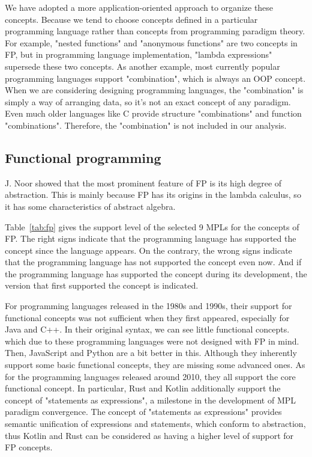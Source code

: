 We have adopted a more application-oriented approach to organize these concepts.
Because we tend to choose concepts defined in a particular programming
language rather than concepts from programming paradigm theory.
For example, "nested functions" and "anonymous functions" are two concepts in FP,
but in programming language implementation, "lambda expressions" supersede these two concepts.
As another example, most currently popular programming languages support "combination",
which is always an OOP concept.
When we are considering designing programming languages, the "combination" is simply a way of
arranging data, so it's not an exact concept of any paradigm.
Even much older languages like C provide structure "combinations" and
function "combinations".
Therefore, the "combination" is not included in our analysis.

\subsection{Functional programming}

J. Noor showed that the most prominent feature of FP is its high degree of abstraction\cite{vezzosi2019cubical}.
This is mainly because FP has its origins in the lambda calculus,
so it has some characteristics of abstract algebra.


Table~\ref{tab:fp} gives the support level of the selected 9 MPLs for the concepts of FP\@.
The right signs indicate that the programming language has
supported the concept since the language appears.
On the contrary, the wrong signs indicate that the programming language has
not supported the concept even now.
And if the programming language has supported the concept during its development,
the version that first supported the concept is indicated.


For programming languages released in the 1980s and 1990s,
their support for functional concepts was not sufficient when they first appeared,
especially for Java and C++.
In their original syntax, we can see little functional concepts.
which due to these programming languages were not designed with FP in mind.
Then, JavaScript and Python are a bit better in this.
Although they inherently support some basic functional concepts, they are missing some advanced ones.
As for the programming languages released around 2010, they all support the core functional concept.
In particular, Rust and Kotlin additionally support the concept of "statements as expressions",
a milestone in the development of MPL paradigm convergence.
The concept of "statements as expressions" provides semantic unification of expressions and statements,
which conform to abstraction,
thus Kotlin and Rust can be considered as having a higher level of support for FP concepts.


